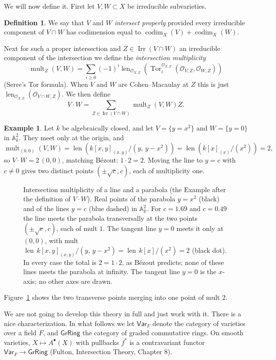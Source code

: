 \documentclass[12pt]{article}
\numberwithin{equation}{section}
\theoremstyle{definition}
\newtheorem{definition}[theorem]{Definition}
\newtheorem{example}[theorem]{Example}
\theoremstyle{remark}
\newcommand{\RR}{\mathbb{R}}
\newcommand{\Tor}{\operatorname{Tor}}
\newcommand{\Ocal}{\mathcal{O}}
\renewcommand{\AA}{\mathbb{A}}
\newcommand{\Var}{\mathsf{Var}}
\newcommand{\GrRing}{\mathsf{GrRing}}
\newcommand{\codim}{\operatorname{codim}}
\newcommand{\mult}{\operatorname{mult}}
\newcommand{\len}{\operatorname{len}}
\newcommand{\Irr}{\operatorname{Irr}}
\begin{document}
We will now define it. First let $V,W\subset X$ be irreducible subvarieties. 
\begin{definition}
We say that $V$ and $W$ \emph{intersect properly} provided every irreducible component of $V\cap W$ has codimension equal to $\codim_X(V)+\codim_X(W)$. 
\end{definition}

Next for such a proper intersection and $Z\in \Irr(V\cap W)$ an irreducible component of the intersection we define the \emph{intersection multiplicity}
 $$ \mult_Z(V,W) = \sum_{i\geq 0} (-1)^i \len_{\Ocal_{X,Z}}\left(\Tor_i^{\Ocal_{X,Z}}(\Ocal_{V,Z},\Ocal_{W,Z})\right) $$
(Serre's Tor formula). When $V$ and $W$ are Cohen--Macaulay at $Z$ this is just $\len_{\Ocal_{X,Z}}(\Ocal_{V\cap W,Z})$.
We then define 
 $$ V \cdot W = \sum_{Z \in \Irr(V\cap W) } \mult_Z(V,W) Z. $$ 

\begin{example}
	Let $k$ be algebraically closed, and let $V=\lbrace y=x^2\rbrace$ and $W=\lbrace y=0\rbrace$ in $\AA^2_k$.
	They meet only at the origin, and
	$$ \mult_{(0,0)}(V,W) = \len\left( k[x,y]_{(x,y)}/(y,\, y-x^2) \right) = \len\left( k[x]_{(x)}/(x^2) \right) = 2, $$
	so $V\cdot W = 2\,(0,0)$, matching B\'ezout: $1\cdot 2=2$.
	Moving the line to $y=c$ with $c\neq 0$ gives two distinct points $(\pm\sqrt{c},c)$, each of multiplicity one.
\begin{figure}[H]
\centering

\caption{Intersection multiplicity of a line and a parabola (the Example after the definition of $V\cdot W$). Real points of the parabola $y=x^2$ (black) and of the lines $y=c$ (blue dashed) in $\AA^2_\RR$. For $c=1.69$ and $c=0.49$ the line meets the parabola transversally at the two points $(\pm\sqrt c,c)$, each of mult $1$. The tangent line $y=0$ meets it only at $(0,0)$, with mult $\len\, k[x,y]_{(x,y)}/(y,\,y-x^2)=\len\, k[x]/(x^2)=2$ (black dot). In every case the total is $2=1\cdot 2$, as B\'ezout predicts; none of these lines meets the parabola at infinity. The tangent line $y=0$ is the $x$-axis; no other axes are drawn.}\label{fig:line-parabola}
\end{figure}
Figure~\ref{fig:line-parabola} shows the two transverse points merging into one point of mult $2$.
\end{example}
 
We are not going to develop this theory in full and just work with it.
There is a nice characterization.
In what follows we let $\Var_F$ denote the category of varieties over a field $F$, and $\GrRing$ the category of graded commutative rings. On smooth varieties, $X\mapsto A^{\bullet}(X)$ with pullbacks $f^*$ is a contravariant functor $\Var_F \to \GrRing$ (Fulton, Intersection Theory, Chapter 8).
\end{document}
